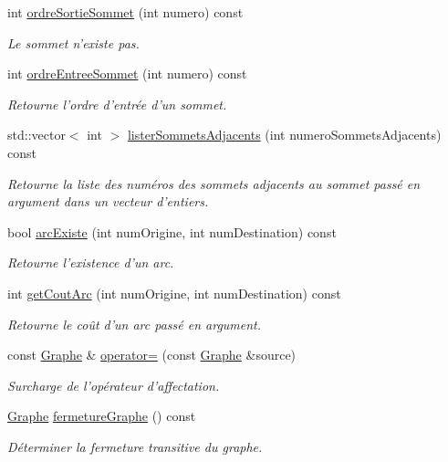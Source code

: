\begin{DoxyCompactItemize}
int \hyperlink{class_graphe_a48e32c28c0845c0e112a3a3ae7bdb882}{ordreSortieSommet} (int numero) const 
\begin{DoxyCompactList}\small\item\em Le sommet n'existe pas. \end{DoxyCompactList}\item 
int \hyperlink{class_graphe_a1123929cab8c05d7fc3f7a4317e88edb}{ordreEntreeSommet} (int numero) const 
\begin{DoxyCompactList}\small\item\em Retourne l'ordre d'entrée d'un sommet. \end{DoxyCompactList}\item 
std::vector$<$ int $>$ \hyperlink{class_graphe_a73fe579de3baea2990bbefb2b0daf0c9}{listerSommetsAdjacents} (int numeroSommetsAdjacents) const 
\begin{DoxyCompactList}\small\item\em Retourne la liste des numéros des sommets adjacents au sommet passé en argument dans un vecteur d'entiers. \end{DoxyCompactList}\item 
bool \hyperlink{class_graphe_a866fbd9e68914829c900b2f3a2ef3565}{arcExiste} (int numOrigine, int numDestination) const 
\begin{DoxyCompactList}\small\item\em Retourne l'existence d'un arc. \end{DoxyCompactList}\item 
int \hyperlink{class_graphe_a5178a5335a20e3a549af0b69c9c83782}{getCoutArc} (int numOrigine, int numDestination) const 
\begin{DoxyCompactList}\small\item\em Retourne le coût d'un arc passé en argument. \end{DoxyCompactList}\item 
const \hyperlink{class_graphe}{Graphe} \& \hyperlink{class_graphe_aff62a5ca152f992f32671db122d47455}{operator=} (const \hyperlink{class_graphe}{Graphe} \&source)
\begin{DoxyCompactList}\small\item\em Surcharge de l'opérateur d'affectation. \end{DoxyCompactList}\item 
\hyperlink{class_graphe}{Graphe} \hyperlink{class_graphe_aa6fafc310fd5a096f75d018c7404f9ed}{fermetureGraphe} () const 
\begin{DoxyCompactList}\small\item\em Déterminer la fermeture transitive du graphe. \end{DoxyCompactList}\item 

\end{DoxyCompactItemize}
